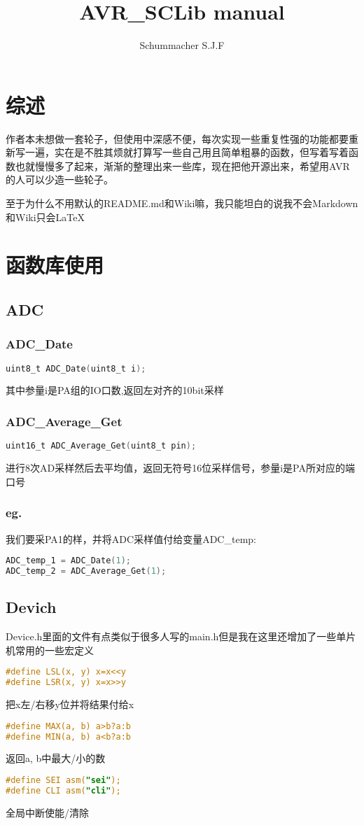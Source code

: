 \documentclass{report}
\title{AVR\_SCLib manual}
\begin{document}
\author{Schummacher S.J.F}
\maketitle
\newpage
\tableofcontents
\newpage
\chapter{综述}
作者本未想做一套轮子，但使用中深感不便，每次实现一些重复性强的功能都要重新写一遍，实在是不胜其烦就打算写一些自己用且简单粗暴的函数，但写着写着函数也就慢慢多了起来，渐渐的整理出来一些库，现在把他开源出来，希望用AVR的人可以少造一些轮子。\par
至于为什么不用默认的README.md和Wiki嘛，我只能坦白的说我不会Markdown和Wiki只会\LaTeX
\chapter{函数库使用}
\section{ADC}
\subsection{ADC\_Date}
\begin{lstlisting}[language=C]
uint8_t ADC_Date(uint8_t i);
\end{lstlisting}
其中参量i是PA组的IO口数,返回左对齐的10bit采样
\subsection{ADC\_Average\_Get}
\begin{lstlisting}[language=C]
uint16_t ADC_Average_Get(uint8_t pin);
\end{lstlisting}
进行8次AD采样然后去平均值，返回无符号16位采样信号，参量i是PA所对应的端口号
\subsection{eg.}
我们要采PA1的样，并将ADC采样值付给变量ADC\_temp:
\begin{lstlisting}[language=C]
ADC_temp_1 = ADC_Date(1);
ADC_temp_2 = ADC_Average_Get(1);
\end{lstlisting}
\section{Devich}
Device.h里面的文件有点类似于很多人写的main.h但是我在这里还增加了一些单片机常用的一些宏定义
\begin{lstlisting}[language=C]
#define LSL(x, y) x=x<<y
#define LSR(x, y) x=x>>y
\end{lstlisting}
把x左/右移y位并将结果付给x
\begin{lstlisting}[language=C]
#define MAX(a, b) a>b?a:b
#define MIN(a, b) a<b?a:b
\end{lstlisting}
返回a, b中最大/小的数
\begin{lstlisting}[language=C]
#define SEI asm("sei");
#define CLI asm("cli");
\end{lstlisting}
全局中断使能/清除
\end{document}
